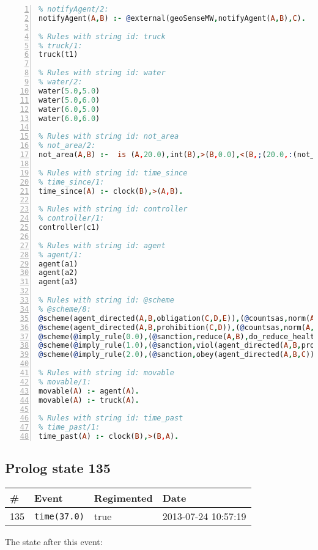 \documentclass[11pt]{article}\usepackage[utf8]{inputenc}\usepackage{geometry}
\begin{document}
\begin{lstlisting}[language=Prolog, numbers=left]
% Rules with string id: notifyAgent
% notifyAgent/2:
notifyAgent(A,B) :- @external(geoSenseMW,notifyAgent(A,B),C).

% Rules with string id: truck
% truck/1:
truck(t1)

% Rules with string id: water
% water/2:
water(5.0,5.0)
water(5.0,6.0)
water(6.0,5.0)
water(6.0,6.0)

% Rules with string id: not_area
% not_area/2:
not_area(A,B) :-  is (A,20.0),int(B),>(B,0.0),<(B,;(20.0,:(not_area(A,B), is (-(B),20.0)))),int(A),>(A,0.0),<(A,;(20.0,:(area(A,B),-(int(A))))),int(B),>(A,0.0),>(B,0.0),<(A,21.0),<(B,21.0).

% Rules with string id: time_since
% time_since/1:
time_since(A) :- clock(B),>(A,B).

% Rules with string id: controller
% controller/1:
controller(c1)

% Rules with string id: agent
% agent/1:
agent(a1)
agent(a2)
agent(a3)

% Rules with string id: @scheme
% @scheme/8:
@scheme(agent_directed(A,B,obligation(C,D,E)),(@countsas,norm(A,B,F,obligation(C,D,E)),F),false,(listTrue(C)),(time_past(D)),false,[plus(viol(agent_directed(A,B,obligation(C,D,E))))|[]],[plus(obey(agent_directed(A,B,obligation(C,D,E))))|[]])
@scheme(agent_directed(A,B,prohibition(C,D)),(@countsas,norm(A,B,E,prohibition(C,D)),E),(listTrue(C)),false,(false),false,[plus(viol(agent_directed(A,B,prohibition(C,D))))|[]],[plus(obey(agent_directed(A,B,prohibition(C,D))))|[]])
@scheme(@imply_rule(0.0),(@sanction,reduce(A,B),do_reduce_health(A,B),notifyAgent(A,changed(status))),true,false,false,false,[min(reduce(A,B))|[]],[])
@scheme(@imply_rule(1.0),(@sanction,viol(agent_directed(A,B,prohibition(C,D))),do_sanction(D)),true,false,false,false,[min(viol(agent_directed(A,B,prohibition(C,D))))|[]],[])
@scheme(@imply_rule(2.0),(@sanction,obey(agent_directed(A,B,C))),true,false,false,false,[min(obey(agent_directed(A,B,C)))|[]],[])

% Rules with string id: movable
% movable/1:
movable(A) :- agent(A).
movable(A) :- truck(A).

% Rules with string id: time_past
% time_past/1:
time_past(A) :- clock(B),>(B,A).

\end{lstlisting}
\clearpage 
\subsection{Prolog state 135}
\begin{table}[ht]
\centering 
\begin{tabular}{l l l l} 
\textbf{\#} & \textbf{Event} & \textbf{Regimented} & \textbf{Date} \\ [0.5ex] 
\hline
135&\texttt{time(37.0)}&true&2013-07-24 10:57:19\\ [1ex] \hline\end{tabular}
\end{table}
The state after this event:
\end{document}
